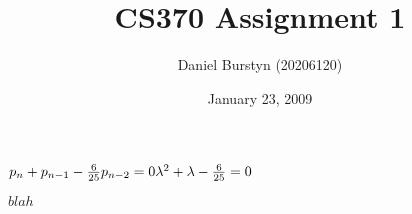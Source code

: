 \documentclass[12pt]{article}
\title{CS370 Assignment 1}
\author{Daniel Burstyn (20206120)}
\date{January 23, 2009}
\begin{document}
\maketitle
{}
\begin{list}{.}{}

\item
{}
\begin{list}{()}{}
\item
\begin{multicols}{2}
$
p_n + p_{n-1} - \frac{6}{25}p_{n-2} = 0\\
\lambda^2 + \lambda - \frac{6}{25} = 0
$

$
blah
$
\end{multicols}

\end{list}

\end{list}
\end{document}

